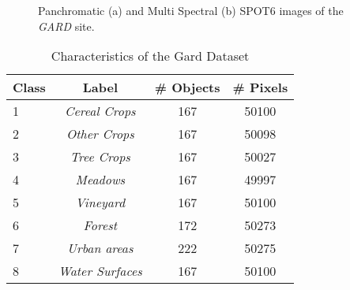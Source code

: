 \documentclass[journal]{IEEEtran}
\begin{document}

\begin{figure}[!ht]
\centering
{}
\caption{ Panchromatic (a) and Multi Spectral (b) SPOT6 images of the \textit{GARD} site. \label{fig:Gard_PAN_XS} }
\end{figure}\begin{table}[!ht]
\centering
\begin{tabular}{|l||c|c|c|}
	\hline
\textbf{Class} & Label & \# \textbf{Objects} & \# \textbf{Pixels} \\ 
\hline \hline
1 & {\em Cereal Crops} & 167 & 50100 \\ \hline
2 & {\em Other Crops} & 167 & 50098  \\ \hline
3 & {\em Tree Crops} & 167 & 50027 \\ \hline
4 & {\em Meadows} & 167 & 49997 \\ \hline
5 & {\em Vineyard} & 167 & 50100 \\ \hline
6 & {\em Forest} & 172 & 50273 \\ \hline
7 & {\em Urban areas} & 222 & 50275 \\ \hline
8 & {\em Water Surfaces} & 167 & 50100 \\ \hline
\end{tabular}
\caption{Characteristics of the Gard Dataset\label{tab:data_gard}}
\end{table}
\end{document}

